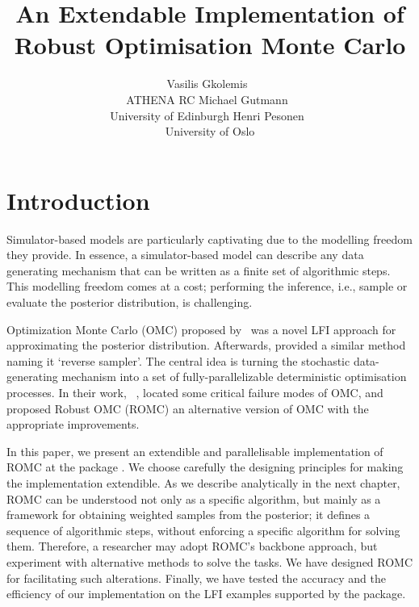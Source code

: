 \documentclass[article]{jss}
\author{Vasilis Gkolemis~\orcidlink{0000-0002-2636-0245}\\ATHENA RC \And
  Michael Gutmann~\orcidlink{0000-0002-5329-9910}\\University of Edinburgh \And
  Henri Pesonen~\orcidlink{0000-0003-4500-2926}\\University of Oslo
}
\title{An Extendable \proglang{Python} Implementation of Robust Optimisation Monte Carlo}
\begin{document}


\section{Introduction} \label{sec:intro}

Simulator-based models are particularly captivating due to the
modelling freedom they provide. In essence, a simulator-based model can
describe any data generating mechanism that can be written as a finite
set of algorithmic steps. This modelling freedom comes at a cost;
performing the inference, i.e., sample or evaluate the posterior
distribution, is challenging.

Optimization Monte Carlo (OMC) proposed by~\citet{Meeds2015} was a
novel LFI approach for approximating the posterior
distribution. Afterwards, \citet{Forneron2016} provided a similar
method naming it `reverse sampler'. The central idea is turning the
stochastic data-generating mechanism into a set of
fully-parallelizable deterministic optimisation processes. In their
work, ~\citet{Ikonomov2019}, located some critical failure modes of
OMC, and proposed Robust OMC (ROMC) an alternative version of OMC with
the appropriate improvements.

In this paper, we present an extendible and parallelisable
implementation of ROMC at the  package . We choose carefully the
designing principles for making the implementation extendible. As we
describe analytically in the next chapter, ROMC can be understood not
only as a specific algorithm, but mainly as a framework for obtaining
weighted samples from the posterior; it defines a sequence of
algorithmic steps, without enforcing a specific algorithm for solving
them. Therefore, a researcher may adopt ROMC's backbone approach, but
experiment with alternative methods to solve the tasks. We have
designed ROMC for facilitating such alterations. Finally, we have
tested the accuracy and the efficiency of our implementation on the
LFI examples supported by the  package.
\end{document}

